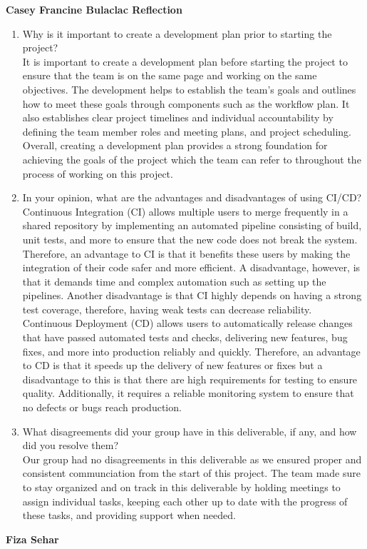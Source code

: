 \documentclass{article}
\begin{document}
\textbf{Casey Francine Bulaclac Reflection}

\begin{enumerate}
    \item Why is it important to create a development plan prior to starting the
    project? \\[1ex]
    It is important to create a development plan before starting the project to ensure that 
    the team is on the same page and working on the same objectives. The development helps to establish 
    the team's goals and outlines how to meet these goals through components such as the workflow plan. 
    It also establishes clear project timelines and individual accountability by 
    defining the team member roles and meeting plans, and project scheduling.
    Overall, creating a development plan provides a strong foundation for achieving the goals
    of the project which the team can refer to throughout the process of working on this project.
    \item In your opinion, what are the advantages and disadvantages of using CI/CD? \\[1ex]
    Continuous Integration (CI) allows multiple users to merge frequently in a shared repository by 
    implementing an automated pipeline consisting of build, unit tests, and more to 
    ensure that the new code does not break the system. Therefore, an advantage to CI is 
    that it benefits these users by making the integration of their code safer and 
    more efficient. A disadvantage, however, is that it demands time and complex automation such as 
    setting up the pipelines. Another disadvantage is that CI highly depends on having a 
    strong test coverage, therefore, having weak tests can decrease reliability. \\
    Continuous Deployment (CD) allows users to automatically release changes that have 
    passed automated tests and checks, delivering new features, bug fixes, and more into 
    production reliably and quickly. Therefore, an advantage to CD is that it speeds up 
    the delivery of new features or fixes but a disadvantage to this is that there are 
    high requirements for testing to ensure quality. Additionally, it requires a reliable 
    monitoring system to ensure that no defects or bugs reach production.

    \item What disagreements did your group have in this deliverable, if any,
    and how did you resolve them? \\[1ex]
    Our group had no disagreements in this deliverable as we ensured proper 
    and consistent communciation from the start of this project. The team made
    sure to stay organized and on track in this deliverable 
    by holding meetings to assign individual tasks, keeping each other up to date with 
    the progress of these tasks, and providing support when needed. 

\end{enumerate}
\textbf{Fiza Sehar}
\end{document}
